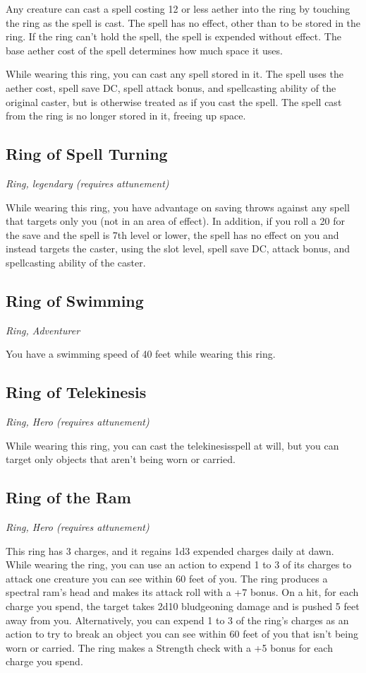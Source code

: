 Any creature can cast a spell costing 12 or less aether into the ring by touching the ring as the spell is cast. The spell has no effect, other than to be stored in the ring. If the ring can't hold the spell, the spell is expended without effect. The base aether cost of the spell determines how much space it uses.

While wearing this ring, you can cast any spell stored in it. The spell uses the aether cost, spell save DC, spell attack bonus, and spellcasting ability of the original caster, but is otherwise treated as if you cast the spell. The spell cast from the ring is no longer stored in it, freeing up space.

\subsection{Ring of Spell Turning}
\textit{Ring, legendary (requires attunement)}

While wearing this ring, you have advantage on saving throws against any spell that targets only you (not in an area of effect). In addition, if you roll a 20 for the save and the spell is 7th level or lower, the spell has no effect on you and instead targets the caster, using the slot level, spell save DC, attack bonus, and spellcasting ability of the caster.

\subsection{Ring of Swimming}
\textit{Ring, Adventurer} 

You have a swimming speed of 40 feet while wearing this ring.

\subsection{Ring of Telekinesis}
\textit{Ring, Hero (requires attunement)}

While wearing this ring, you can cast the telekinesisspell at will, but you can target only objects that aren't being worn or carried.

\subsection{Ring of the Ram}
\textit{Ring, Hero (requires attunement)}

This ring has 3 charges, and it regains 1d3 expended charges daily at dawn. While wearing the ring, you can use an action to expend 1 to 3 of its charges to attack one creature you can see within 60 feet of you. The ring produces a spectral ram's head and makes its attack roll with a +7 bonus. On a hit, for each charge you spend, the target takes 2d10 bludgeoning damage and is pushed 5 feet away from you.  Alternatively, you can expend 1 to 3 of the ring's charges as an action to try to break an object you can see within 60 feet of you that isn't being worn or carried. The ring makes a Strength check with a +5 bonus for each charge you spend.

